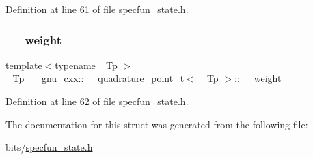 Definition at line 61 of file specfun\+\_\+state.\+h.

\mbox{\label{struct____gnu__cxx_1_1____quadrature__point__t_a231e04e186e8e45b431876cc958a81c2}} 
\subsubsection{\texorpdfstring{\+\_\+\+\_\+weight}{\_\_weight}}
{\footnotesize\ttfamily template$<$typename \+\_\+\+Tp $>$ \\
\+\_\+\+Tp \hyperlink{struct____gnu__cxx_1_1____quadrature__point__t}{\+\_\+\+\_\+gnu\+\_\+cxx\+::\+\_\+\+\_\+quadrature\+\_\+point\+\_\+t}$<$ \+\_\+\+Tp $>$\+::\+\_\+\+\_\+weight}



Definition at line 62 of file specfun\+\_\+state.\+h.



The documentation for this struct was generated from the following file\+:\begin{DoxyCompactItemize}
\item 
bits/\hyperlink{specfun__state_8h}{specfun\+\_\+state.\+h}\end{DoxyCompactItemize}
